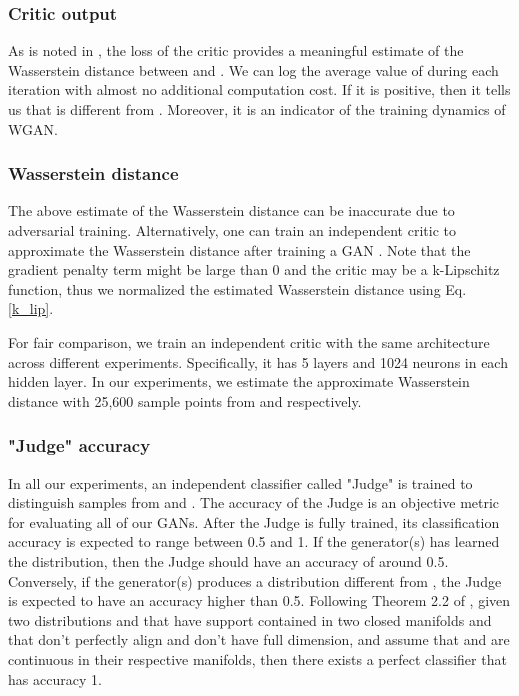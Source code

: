 \documentclass[conference]{IEEEtran}
\begin{document}
\subsubsection{Critic output}
As is noted in \cite{wgan}, the loss of the critic provides a meaningful estimate of the Wasserstein distance between  and . We can log the average value of  during each iteration with almost no additional computation cost. If it is positive, then it tells us that  is different from . Moreover, it is an indicator of the training dynamics of WGAN.

\subsubsection {Wasserstein distance} 
The above estimate of the Wasserstein distance can be inaccurate due to adversarial training. Alternatively, one can train an independent critic to approximate the Wasserstein distance after training a GAN \cite{comparison_of_ml_and_gan}. Note that the gradient penalty term might be large than 0 and the critic may be a k-Lipschitz function, thus we normalized the estimated Wasserstein distance using Eq. \ref{k_lip}.

For fair comparison, we train an independent critic with the same architecture across different experiments. Specifically, it has 5 layers and 1024 neurons in each hidden layer.
In our experiments, we estimate the approximate Wasserstein distance  with 25,600 sample points from  and  respectively. 

\subsubsection {"Judge" accuracy} 
In all our experiments, an independent classifier called "Judge" is trained to distinguish samples from  and . The accuracy of the Judge is an objective metric for evaluating all of our GANs. After the Judge is fully trained, its classification accuracy is expected to range between 0.5 and 1. If the generator(s) has learned the distribution, then the Judge should have an accuracy of around 0.5. Conversely, if the generator(s) produces a distribution different from , the Judge is expected to have an accuracy higher than 0.5. 
Following Theorem 2.2 of \cite{towardsprincipled}, given two distributions  and  that have support contained in two closed manifolds  and  that don’t perfectly align and don’t have full dimension, and assume that  and  are continuous in their respective manifolds, then there exists a perfect classifier that has accuracy 1.
\end{document}
